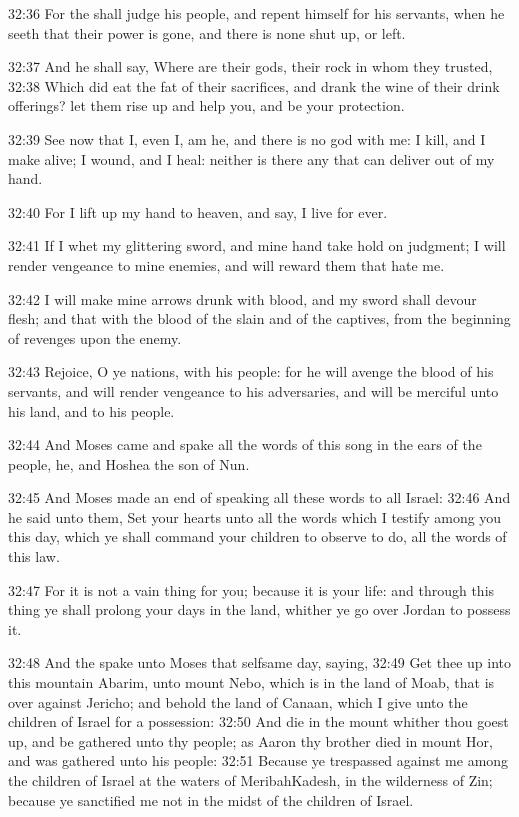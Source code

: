 32:36 For the \LORD shall judge his people, and repent himself for his servants, when he seeth that their power is gone, and there is none shut up, or left.

32:37 And he shall say, Where are their gods, their rock in whom they trusted, 32:38 Which did eat the fat of their sacrifices, and drank the wine of their drink offerings? let them rise up and help you, and be your protection.

32:39 See now that I, even I, am he, and there is no god with me: I kill, and I make alive; I wound, and I heal: neither is there any that can deliver out of my hand.

32:40 For I lift up my hand to heaven, and say, I live for ever.

32:41 If I whet my glittering sword, and mine hand take hold on judgment; I will render vengeance to mine enemies, and will reward them that hate me.

32:42 I will make mine arrows drunk with blood, and my sword shall devour flesh; and that with the blood of the slain and of the captives, from the beginning of revenges upon the enemy.

32:43 Rejoice, O ye nations, with his people: for he will avenge the blood of his servants, and will render vengeance to his adversaries, and will be merciful unto his land, and to his people.

32:44 And Moses came and spake all the words of this song in the ears of the people, he, and Hoshea the son of Nun.

32:45 And Moses made an end of speaking all these words to all Israel: 32:46 And he said unto them, Set your hearts unto all the words which I testify among you this day, which ye shall command your children to observe to do, all the words of this law.

32:47 For it is not a vain thing for you; because it is your life: and through this thing ye shall prolong your days in the land, whither ye go over Jordan to possess it.

32:48 And the \LORD spake unto Moses that selfsame day, saying, 32:49 Get thee up into this mountain Abarim, unto mount Nebo, which is in the land of Moab, that is over against Jericho; and behold the land of Canaan, which I give unto the children of Israel for a possession: 32:50 And die in the mount whither thou goest up, and be gathered unto thy people; as Aaron thy brother died in mount Hor, and was gathered unto his people: 32:51 Because ye trespassed against me among the children of Israel at the waters of MeribahKadesh, in the wilderness of Zin; because ye sanctified me not in the midst of the children of Israel.

